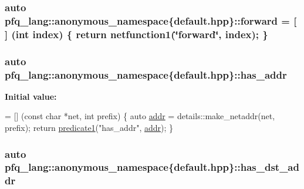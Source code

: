 \hypertarget{namespacepfq__lang_1_1anonymous__namespace_02default_8hpp_03_a7fbe4b2614dd240727bf1696b4d06523}{
\subsubsection[{forward}]{\setlength{\rightskip}{0pt plus 5cm}auto pfq\-\_\-lang\-::anonymous\-\_\-namespace\{default.\-hpp\}\-::forward = \mbox{[}$\,$\mbox{]} (int index) \{ return {\bf netfunction1}(\char`\"{}forward\char`\"{}, index); \}}}\label{namespacepfq__lang_1_1anonymous__namespace_02default_8hpp_03_a7fbe4b2614dd240727bf1696b4d06523}
\hypertarget{namespacepfq__lang_1_1anonymous__namespace_02default_8hpp_03_ac3ef3eefe441b183db012637b4459836}{
\subsubsection[{has\-\_\-addr}]{\setlength{\rightskip}{0pt plus 5cm}auto pfq\-\_\-lang\-::anonymous\-\_\-namespace\{default.\-hpp\}\-::has\-\_\-addr}}\label{namespacepfq__lang_1_1anonymous__namespace_02default_8hpp_03_ac3ef3eefe441b183db012637b4459836}
{\bfseries Initial value\-:}
\begin{DoxyCode}
= [] (\textcolor{keyword}{const} \textcolor{keywordtype}{char} *net, \textcolor{keywordtype}{int} prefix)
        \{
            \textcolor{keyword}{auto} \hyperlink{namespacepfq__lang_1_1anonymous__namespace_02default_8hpp_03_aafce8334d1be83bff9a2115439c8c453}{addr} = details::make\_netaddr(net, prefix);
            \textcolor{keywordflow}{return} \hyperlink{namespacepfq__lang_ae23a03cee94b5ddfde4a8d2e5c521f0e}{predicate1}(\textcolor{stringliteral}{"has\_addr"}, \hyperlink{namespacepfq__lang_1_1anonymous__namespace_02default_8hpp_03_aafce8334d1be83bff9a2115439c8c453}{addr});
        \}
\end{DoxyCode}
\hypertarget{namespacepfq__lang_1_1anonymous__namespace_02default_8hpp_03_af223a0513ceffa69c0b8535a7cca12da}{
\subsubsection[{has\-\_\-dst\-\_\-addr}]{\setlength{\rightskip}{0pt plus 5cm}auto pfq\-\_\-lang\-::anonymous\-\_\-namespace\{default.\-hpp\}\-::has\-\_\-dst\-\_\-addr}}\label{namespacepfq__lang_1_1anonymous__namespace_02default_8hpp_03_af223a0513ceffa69c0b8535a7cca12da}
